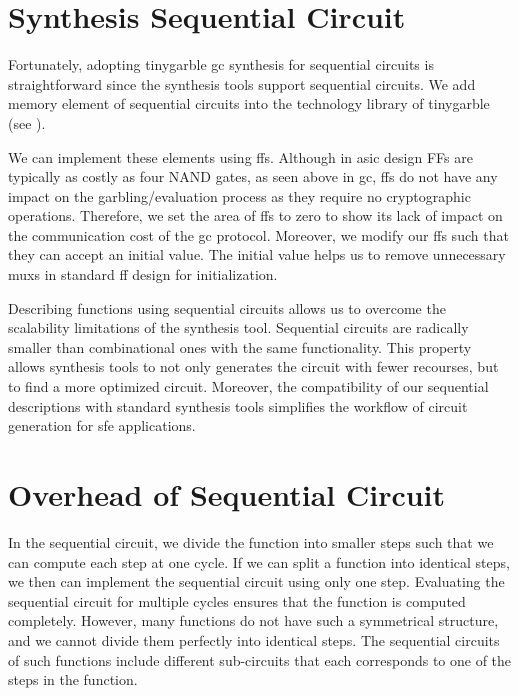 \section{Synthesis Sequential Circuit}\label{sec:seq-syn}
Fortunately, adopting \gls{tinygarble} \acrshort{gc} synthesis for sequential circuits is straightforward since the synthesis tools support sequential circuits.
We add memory element of sequential circuits into the technology library of \gls{tinygarble} (see ).

We can implement these elements using \acrshort{ff}s. Although in \acrshort{asic} design FFs are typically as costly as four NAND gates, as seen above in \acrshort{gc}, \acrshort{ff}s do not have any impact on the garbling/evaluation process as they require no cryptographic operations.
Therefore, we set the area of \acrshort{ff}s to zero to show its lack of impact on the communication cost of the \acrshort{gc} protocol.
Moreover, we modify our \acrshort{ff}s such that they can accept an initial value.
The initial value helps us to remove unnecessary \acrshort{mux}s in standard \acrshort{ff} design for initialization.

Describing functions using sequential circuits allows us to overcome the scalability limitations of the synthesis tool.
Sequential circuits are radically smaller than combinational ones with the same functionality.
This property allows synthesis tools to not only generates the circuit with fewer recourses, but to find a more optimized circuit.
Moreover, the compatibility of our sequential descriptions with standard synthesis tools simplifies the workflow of circuit generation for \acrshort{sfe} applications.

\section{Overhead of Sequential Circuit}\label{sec:seq-overhead}
In the sequential circuit, we divide the function into smaller steps such that we can compute each step at one cycle.
If we can split a function into identical steps, we then can implement the sequential circuit using only one step.
Evaluating the sequential circuit for multiple cycles ensures that the function is computed completely.
However, many functions do not have such a symmetrical structure, and we cannot divide them perfectly into identical steps.
The sequential circuits of such functions include different sub-circuits that each corresponds to one of the steps in the function.

